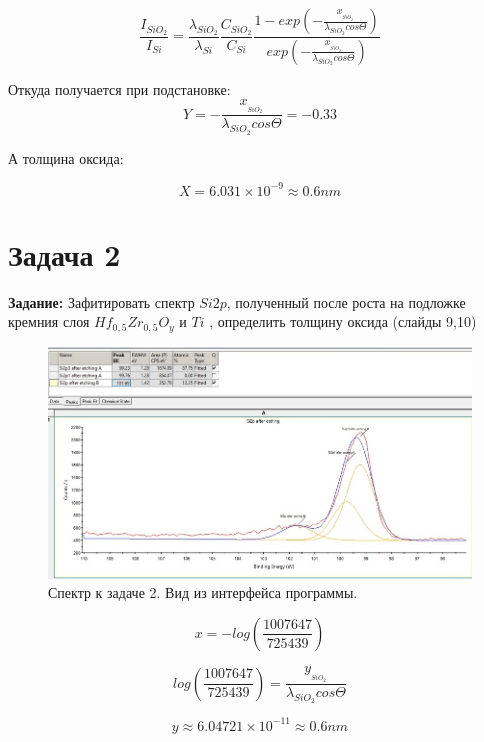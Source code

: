 \documentclass[a4paper,12pt]{article} %
\begin{document}
$$ \frac{I_{SiO_2}}{ I_{Si}} = \frac{\lambda_{SiO_2}}{\lambda_{Si}} \frac{C_{SiO_2}}{C_{Si}} \frac{1- exp( - \frac{x__{SiO_2}}{\lambda_{SiO_2}cos\Theta} ) } {exp( - \frac{x__{SiO_2}}{\lambda_{SiO_2}cos\Theta} )} $$


Откуда получается при подстановке:
\begin{equation}
	Y = - \frac{x__{SiO_2}}{\lambda_{SiO_2}cos\Theta} =  - 0.33
\end{equation}

А толщина оксида:

\begin{equation}
	X = 6.031\times 10^{-9} \approx 0.6 nm
\end{equation}



\section{Задача 2}
\textbf{Задание:} Зафитировать спектр $ Si 2p $, полученный после роста на подложке кремния слоя
$ Hf_{0,5} Zr_{0,5} O_y $ и $ Ti $ , определить толщину оксида (слайды 9,10)



\begin{figure}[H]
	\centering
	\includegraphics[width=0.8\linewidth]{2.jpg}
	\caption{Спектр к задаче 2. Вид из интерфейса программы.}
	\label{fig2}
\end{figure}

$$ x = - log(\frac{1007647}{725439}) $$


$$  log(\frac{1007647}{725439}) =  \frac{y__{SiO_2}}{\lambda_{SiO_2}cos\Theta} $$

$$ y \approx 6.04721 \times 10^{-11} \approx 0.6 nm $$
\end{document}

